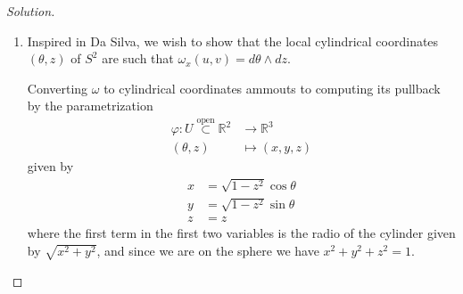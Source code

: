 \begin{proof}[Solution]\leavevmode
	\begin{enumerate}[label=\alph*.]
		\item Inspired in Da Silva, we wish to show that the local cylindrical coordinates $(\theta,z)$ of  $S^{2}$ are such that $\omega_x(u,v)=d\theta\wedge dz$.

			Converting $\omega$ to cylindrical coordinates ammouts to computing its pullback by the parametrization 
			\begin{align*}
				\varphi: U\overset{\operatorname{open}}{\subset}\mathbb{R}^{2} &\longrightarrow \mathbb{R}^{3} \\
				(\theta,z) &\longmapsto (x,y,z)
			\end{align*}
			given by
			\begin{align*}
				x&=\sqrt{1-z^2} \cos \theta\\
				y& =\sqrt{1-z^2} \sin \theta\\
				z&=z
			\end{align*}
			where the first term in the first two variables is the radio of the cylinder given by $\sqrt{x^2+y^2} $, and since we are on the sphere we have $x^2+y^2+z^2=1$.


\end{enumerate}
\end{proof}
